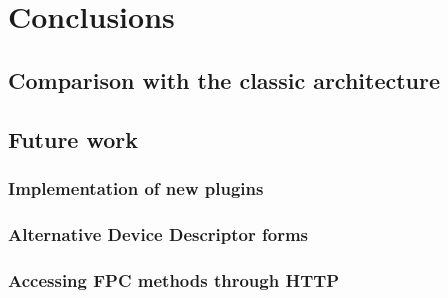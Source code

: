 \chapter{Conclusions}
\label{cha:conclusions}

\section{Comparison with the classic architecture}

\section{Future work}

\subsection{Implementation of new plugins}

\subsection{Alternative Device Descriptor forms}

\subsection{Accessing FPC methods through HTTP}
